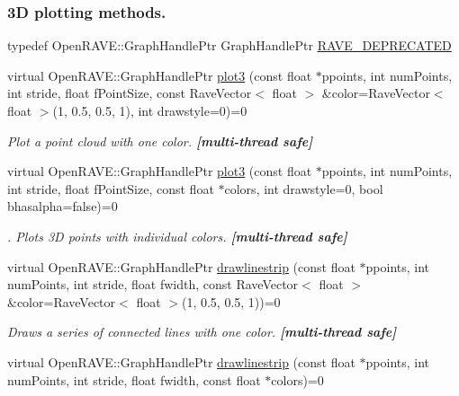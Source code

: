 \subsubsection*{3D plotting methods.}
\label{_amgrp17df1b1b7c6672ea6063fd55d8c517c4}
 \label{classOpenRAVE_1_1EnvironmentBase_env_plotting}
\hypertarget{classOpenRAVE_1_1EnvironmentBase_env_plotting}{}
 \begin{DoxyCompactItemize}
\item 
typedef OpenRAVE::GraphHandlePtr GraphHandlePtr \hyperlink{classOpenRAVE_1_1EnvironmentBase_acb298cf75a95a9dcfdc2bfccd7321413}{RAVE\_\-DEPRECATED}
\item 
virtual OpenRAVE::GraphHandlePtr \hyperlink{classOpenRAVE_1_1EnvironmentBase_a390a0a4590d91f0994d6bf2781688266}{plot3} (const float $\ast$ppoints, int numPoints, int stride, float fPointSize, const RaveVector$<$ float $>$ \&color=RaveVector$<$ float $>$(1, 0.5, 0.5, 1), int drawstyle=0)=0
\begin{DoxyCompactList}\small\item\em Plot a point cloud with one color. {\bfseries \mbox{[}multi-\/thread safe\mbox{]}} \item\end{DoxyCompactList}\item 
virtual OpenRAVE::GraphHandlePtr \hyperlink{classOpenRAVE_1_1EnvironmentBase_a367a6d07f961f2ed0a48378c7dea2336}{plot3} (const float $\ast$ppoints, int numPoints, int stride, float fPointSize, const float $\ast$colors, int drawstyle=0, bool bhasalpha=false)=0
\begin{DoxyCompactList}\small\item\em . Plots 3D points with individual colors. {\bfseries \mbox{[}multi-\/thread safe\mbox{]}} \item\end{DoxyCompactList}\item 
virtual OpenRAVE::GraphHandlePtr \hyperlink{classOpenRAVE_1_1EnvironmentBase_a378e5e874d3a39868cd787e5936cf7fa}{drawlinestrip} (const float $\ast$ppoints, int numPoints, int stride, float fwidth, const RaveVector$<$ float $>$ \&color=RaveVector$<$ float $>$(1, 0.5, 0.5, 1))=0
\begin{DoxyCompactList}\small\item\em Draws a series of connected lines with one color. {\bfseries \mbox{[}multi-\/thread safe\mbox{]}} \item\end{DoxyCompactList}\item 
virtual OpenRAVE::GraphHandlePtr \hyperlink{classOpenRAVE_1_1EnvironmentBase_ac1aba9c68455f30fe87d62624a31b1a6}{drawlinestrip} (const float $\ast$ppoints, int numPoints, int stride, float fwidth, const float $\ast$colors)=0

\end{DoxyCompactItemize}
